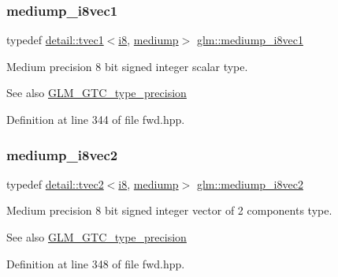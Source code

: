 \subsubsection{\texorpdfstring{mediump\+\_\+i8vec1}{mediump\_i8vec1}}
{\footnotesize\ttfamily typedef \hyperlink{structglm_1_1detail_1_1tvec1}{detail\+::tvec1}$<$\hyperlink{group__gtc__type__precision_gaae064be68b7d36cd7910c16e8ad18bba}{i8}, \hyperlink{namespaceglm_a0f04f086094c747d227af4425893f545a6416f3ea0c9025fb21ed50c4d6620482}{mediump}$>$ \hyperlink{group__gtc__type__precision_ga820f8b497e06d518968d00761747c547}{glm\+::mediump\+\_\+i8vec1}}

Medium precision 8 bit signed integer scalar type. \begin{DoxySeeAlso}{See also}
\hyperlink{group__gtc__type__precision}{G\+L\+M\+\_\+\+G\+T\+C\+\_\+type\+\_\+precision} 
\end{DoxySeeAlso}


Definition at line 344 of file fwd.\+hpp.

\mbox{\label{group__gtc__type__precision_ga38eba1ab306fe5cc5eeafa35ce5b5b26}} 
\subsubsection{\texorpdfstring{mediump\+\_\+i8vec2}{mediump\_i8vec2}}
{\footnotesize\ttfamily typedef \hyperlink{structglm_1_1detail_1_1tvec2}{detail\+::tvec2}$<$\hyperlink{group__gtc__type__precision_gaae064be68b7d36cd7910c16e8ad18bba}{i8}, \hyperlink{namespaceglm_a0f04f086094c747d227af4425893f545a6416f3ea0c9025fb21ed50c4d6620482}{mediump}$>$ \hyperlink{group__gtc__type__precision_ga38eba1ab306fe5cc5eeafa35ce5b5b26}{glm\+::mediump\+\_\+i8vec2}}

Medium precision 8 bit signed integer vector of 2 components type. \begin{DoxySeeAlso}{See also}
\hyperlink{group__gtc__type__precision}{G\+L\+M\+\_\+\+G\+T\+C\+\_\+type\+\_\+precision} 
\end{DoxySeeAlso}


Definition at line 348 of file fwd.\+hpp.

\mbox{\label{group__gtc__type__precision_ga91b40a693c1db26a7cc544339b326df3}} 
